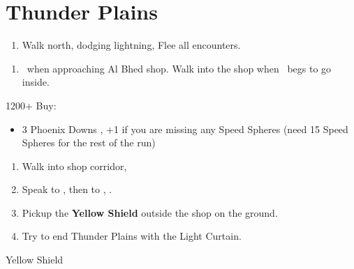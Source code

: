 \chapter{Thunder Plains}

\begin{enumerate}
    \item Walk north, dodging lightning, Flee all encounters.
\end{enumerate}
\begin{enumerate}[resume]
    \item \sd\ when approaching Al Bhed shop. Walk into the shop when \rikku\ begs to go inside.
\end{enumerate}
\begin{shop}{1200+}
    Buy:
    \begin{itemize}
        \item 3 Phoenix Downs
        , +1 if you are missing any Speed Spheres (need 15 Speed Spheres for the rest of the run)
    \end{itemize}
\end{shop}
\begin{enumerate}[resume]
    \item Walk into shop corridor, \cs[2:00]
    \item Speak to \auron, then to \rikku, \sd.
    \item Pickup the \textbf{Yellow Shield} outside the shop on the ground.
    \item Try to end Thunder Plains with the Light Curtain.
\end{enumerate}
\begin{equip}
\begin{itemize}
\tidusf Yellow Shield
\end{itemize}
\end{equip}
